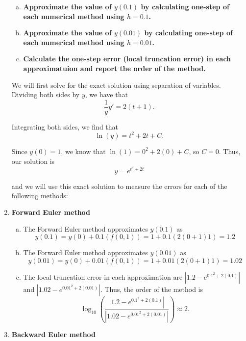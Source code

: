 \documentclass[11pt]{article}
\theoremstyle{definition}
\begin{document}
\begin{enumerate}
    \begin{enumerate}[a)]
        \item \textbf{Approximate the value of $y(0.1)$ by calculating one-step of each numerical method using $h = 0.1$.}
        \item \textbf{Approximate the value of $y(0.01)$ by calculating one-step of each numerical method using $h = 0.01$.}
        \item \textbf{Calculate the one-step error (local truncation error) in each approximatuion and report the order of the method.}
    \end{enumerate}

    We will first solve for the exact solution using separation of variables. Dividing both sides by $y$, we have that
    \[ \frac{1}{y} y' = 2(t+1).\]

    Integrating both sides, we find that 
    \[ \ln(y) = t^2 + 2t + C.\]

    Since $y(0) = 1$, we know that $\ln(1) = 0^2 + 2(0) + C$, so $C=0$. Thus, our solution is 
    \[ \boxed{y = e^{t^2 + 2t}} \]

    and we will use this exact solution to measure the errors for each of the following methods:


    \item \textbf{Forward Euler method}
    
    \begin{enumerate}[a)]
        \item The Forward Euler method approximates $y(0.1)$ as \[ y(0.1) = y(0) + 0.1(f(0, 1)) = 1 + 0.1(2(0+1)1) = \boxed{1.2} \]
        \item The Forward Euler method approximates $y(0.01)$ as \[ y(0.01) = y(0) + 0.01(f(0, 1)) = 1 + 0.01(2(0+1)1) = \boxed{1.02} \]
        \item The local truncation error in each approximation are $\left|1.2 - e^{0.1^2 + 2(0.1)}\right|$ and $\left|1.02 - e^{0.01^2 + 2(0.01)} \right|.$ 
         Thus, the order of the method is \[ \log_{10} \left( \frac{\left|1.2 - e^{0.1^2 + 2(0.1)}\right|}{\left|1.02 - e^{0.01^2 + 2(0.01)} \right|} \right) \approx \boxed{2}. \]
    \end{enumerate}

    \newpage

    \item \textbf{Backward Euler method}


\end{enumerate}
\end{document}
